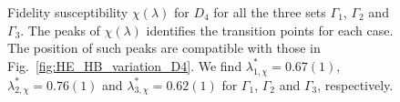 \clearpage

\begin{figure}[t]
    \centering
    
    \caption[Fidelity susceptibility for $D_4$]{%
        Fidelity susceptibility $\chi(\lambda)$ for $D_4$ for all the three sets $\Gamma_1$, $\Gamma_2$ and $\Gamma_3$.
        The peaks of $\chi(\lambda)$ identifies the transition points for each case.
        The position of such peaks are compatible with those in Fig.~\ref{fig:HE_HB_variation_D4}.
        We find $\lambda_{1, \chi}^*=0.67(1)$, $\lambda_{2, \chi}^*=0.76(1)$ and $\lambda_{3, \chi}^*=0.62(1)$ for $\Gamma_1$, $\Gamma_2$ and $\Gamma_3$, respectively.
    }
    \label{fig:fidelity_D4}
\end{figure}

\newpage

